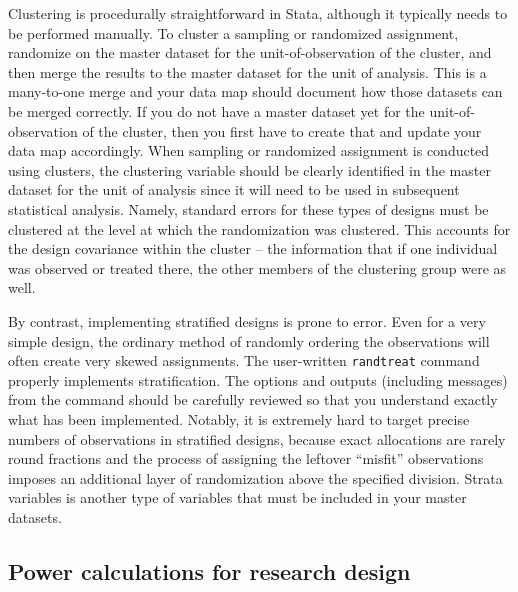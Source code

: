 Clustering is procedurally straightforward in Stata,
although it typically needs to be performed manually.
To cluster a sampling or randomized assignment,
randomize on the master dataset for the unit-of-observation of the cluster,
and then merge the results to the master dataset for the unit of analysis.
This is a many-to-one merge and your data map should document
how those datasets can be merged correctly.
If you do not have a master dataset yet for the unit-of-observation of the cluster,
then you first have to create that and update your data map accordingly.
When sampling or randomized assignment is conducted using clusters,
the clustering variable should be clearly identified in the master dataset
for the unit of analysis
since it will need to be used in subsequent statistical analysis.
Namely, standard errors for these types of designs must be clustered
at the level at which the randomization was clustered.
This accounts for the design covariance within the cluster --
the information that if one individual was observed or treated there,
the other members of the clustering group were as well.

By contrast, implementing stratified designs is prone to error.
Even for a very simple design, the ordinary method of randomly ordering the observations
will often create very skewed assignments.
The user-written \texttt{randtreat} command properly implements stratification.\cite{carril2017dealing}
The options and outputs (including messages) from the command should be carefully reviewed
so that you understand exactly what has been implemented.
Notably, it is extremely hard to target precise numbers of observations
in stratified designs, because exact allocations are rarely round fractions
and the process of assigning the leftover ``misfit'' observations
imposes an additional layer of randomization above the specified division.
Strata variables is another type of variables that must be included in your master datasets.


\subsection{Power calculations for research design}

